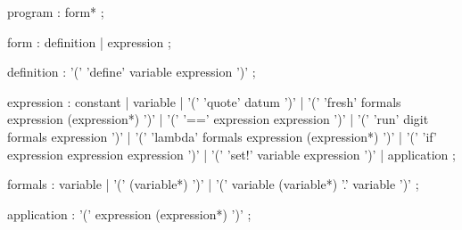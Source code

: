 \begin{rail}
  program : form* ;

  form : definition | expression ;

  definition : '(' 'define' variable expression ')' ;

  expression : constant
  | variable
  | '(' 'quote' datum ')'
  | '(' 'fresh' formals expression (expression*) ')'
  | '(' '==' expression expression ')'
  | '(' 'run' digit formals expression ')'
  | '(' 'lambda' formals expression (expression*) ')'
  | '(' 'if' expression expression expression ')'
  | '(' 'set!' variable expression ')'
  | application ;

  formals : variable
  | '(' (variable*) ')'
  | '(' variable (variable*) '.' variable ')' ;

  application : '(' expression (expression*) ')' ;

\end{rail}
